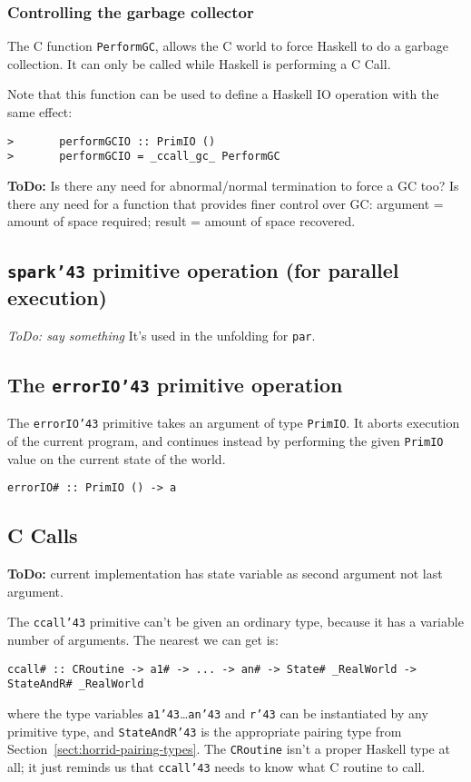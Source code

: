 \subsubsection{Controlling the garbage collector}

The C function {\tt PerformGC\/}, allows the C world to force Haskell
to do a garbage collection.  It can only be called while Haskell
is performing a C Call.

Note that this function can be used to define a Haskell IO operation
with the same effect:
\begin{verbatim}
>       performGCIO :: PrimIO ()
>       performGCIO = _ccall_gc_ PerformGC
\end{verbatim}

{\bf ToDo:} Is there any need for abnormal/normal termination to force
a GC too?  Is there any need for a function that provides finer
control over GC: argument = amount of space required; result = amount
of space recovered.

\subsection{\mbox{\tt spark{\char'43}} primitive operation (for parallel execution)}

{\em ToDo: say something}  It's used in the unfolding for \mbox{\tt par}.

\subsection{The \mbox{\tt errorIO{\char'43}} primitive operation}

The \mbox{\tt errorIO{\char'43}} primitive takes an argument of type \mbox{\tt PrimIO}.  It aborts execution of
the current program, and continues instead by performing the given \mbox{\tt PrimIO} value
on the current state of the world.
\begin{verbatim}
errorIO# :: PrimIO () -> a
\end{verbatim}

\subsection{C Calls}

{\bf ToDo:} current implementation has state variable as second
argument not last argument.

The \mbox{\tt ccall{\char'43}} primitive can't be given an ordinary type, because it has
a variable number of arguments.  The nearest we can get is:
\begin{verbatim}
ccall# :: CRoutine -> a1# -> ... -> an# -> State# _RealWorld -> StateAndR# _RealWorld
\end{verbatim}
where the type variables \mbox{\tt a1{\char'43}}\ldots\mbox{\tt an{\char'43}} and \mbox{\tt r{\char'43}} can be instantiated by any
primitive type, and \mbox{\tt StateAndR{\char'43}} is the appropriate pairing type from 
Section~\ref{sect:horrid-pairing-types}.  The \mbox{\tt CRoutine} 
isn't a proper Haskell type at all; it just reminds us that \mbox{\tt ccall{\char'43}} needs to 
know what C routine to call.

